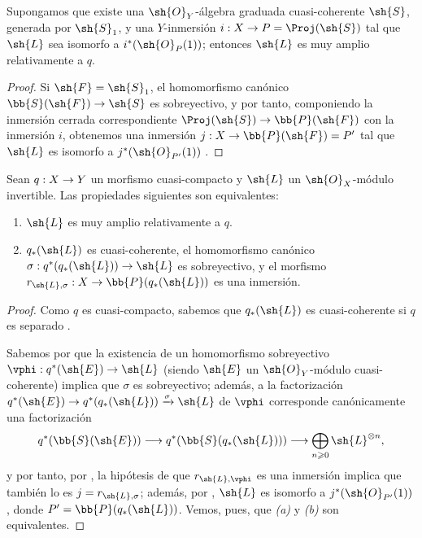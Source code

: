 \documentclass[oneside,10pt]{amsart}
\makeatletter
\renewcommand{\geq}{\geqslant}
\newcommand{\ega@arrow}[2]{\mathchoice{#1}{#2}{#2}{#2}}
\renewcommand{\to}{\ega@arrow{\longrightarrow}{\rightarrow}}
\newcommand{\oldpage}[2][]{\marginnote{\normalfont\footnotesize\textbf{#1}~|~#2}\ignorespaces}
\let\EGAOriginalLabel\label
\renewcommand{\label}[1]{\phantomsection\EGAOriginalLabel{#1}}
\makeatother
\begin{document}
\begin{corollary}[4.4.3]
\label{II.4.4.3}
Supongamos que existe una $\sh{O}_Y$-álgebra graduada cuasi-coherente $\sh{S}$, generada por $\sh{S}_1$, y una $Y$-inmersión $i:X\to P=\Proj(\sh{S})$ tal que $\sh{L}$ sea isomorfo a $i^*(\sh{O}_P(1))$;
entonces $\sh{L}$ es muy amplio relativamente a $q$.
\end{corollary}

\begin{proof}
Si $\sh{F}=\sh{S}_1$, el homomorfismo canónico $\bb{S}(\sh{F})\to\sh{S}$ es sobreyectivo, y por tanto, componiendo la inmersión cerrada correspondiente $\Proj(\sh{S})\to\bb{P}(\sh{F})$  con la inmersión $i$, obtenemos una inmersión $j:X\to\bb{P}(\sh{F})=P'$ tal que $\sh{L}$ es isomorfo a $j^*(\sh{O}_{P'}(1))$ .
\end{proof}

\begin{proposition}[4.4.4]
\label{II.4.4.4}
Sean $q:X\to Y$ un morfismo cuasi-compacto y $\sh{L}$ un $\sh{O}_X$-módulo invertible.
Las propiedades siguientes son equivalentes:
\begin{enumerate}
  \item[\rm{(a)}] $\sh{L}$ es muy amplio relativamente a $q$.
  \item[\rm{(b)}] $q_*(\sh{L})$ es cuasi-coherente, el homomorfismo canónico $\sigma:q^*(q_*(\sh{L}))\to\sh{L}$ es sobreyectivo, y el morfismo $r_{\sh{L},\sigma}:X\to\bb{P}(q_*(\sh{L}))$ es una inmersión.
\end{enumerate}
\end{proposition}

\begin{proof}
Como $q$ es cuasi-compacto, sabemos que $q_*(\sh{L})$ es cuasi-coherente si $q$ es separado .

\oldpage[II]{80}
Sabemos por  que la existencia de un homomorfismo sobreyectivo $\vphi:q^*(\sh{E})\to\sh{L}$ (siendo $\sh{E}$ un $\sh{O}_Y$-módulo cuasi-coherente) implica que $\sigma$ es sobreyectivo;
además, a la factorización $q^*(\sh{E})\to q^*(q_*(\sh{L}))\xrightarrow{\sigma}\sh{L}$ de $\vphi$ corresponde canónicamente una factorización
\[
  q^*(\bb{S}(\sh{E}))\to q^*(\bb{S}(q_*(\sh{L})))\to\bigoplus_{n\geq0}\sh{L}^{\otimes n},
\]
y por tanto, por , la hipótesis de que $r_{\sh{L},\vphi}$ es una inmersión implica que también lo es $j=r_{\sh{L},\sigma}$;
además, por , $\sh{L}$ es isomorfo a $j^*(\sh{O}_{P'}(1))$, donde $P'=\bb{P}(q_*(\sh{L}))$.
Vemos, pues, que \emph{(a)} y \emph{(b)} son equivalentes.
\end{proof}
\end{document}

